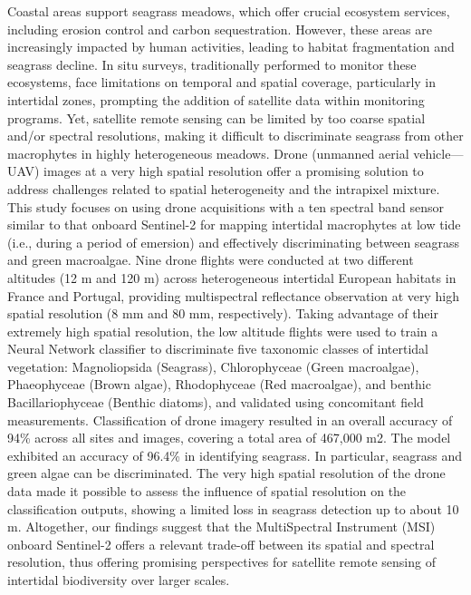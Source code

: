 \documentclass[
  letterpaper,
  11pt,
  english,
  singlespacing,
  headsepline]{MastersDoctoralThesis}
\begin{document}

Coastal areas support seagrass meadows, which offer crucial ecosystem
services, including erosion control and carbon sequestration. However,
these areas are increasingly impacted by human activities, leading to
habitat fragmentation and seagrass decline. In situ surveys,
traditionally performed to monitor these ecosystems, face limitations on
temporal and spatial coverage, particularly in intertidal zones,
prompting the addition of satellite data within monitoring programs.
Yet, satellite remote sensing can be limited by too coarse spatial
and/or spectral resolutions, making it difficult to discriminate
seagrass from other macrophytes in highly heterogeneous meadows. Drone
(unmanned aerial vehicle---UAV) images at a very high spatial resolution
offer a promising solution to address challenges related to spatial
heterogeneity and the intrapixel mixture. This study focuses on using
drone acquisitions with a ten spectral band sensor similar to that
onboard Sentinel-2 for mapping intertidal macrophytes at low tide (i.e.,
during a period of emersion) and effectively discriminating between
seagrass and green macroalgae. Nine drone flights were conducted at two
different altitudes (12 m and 120 m) across heterogeneous intertidal
European habitats in France and Portugal, providing multispectral
reflectance observation at very high spatial resolution (8 mm and 80 mm,
respectively). Taking advantage of their extremely high spatial
resolution, the low altitude flights were used to train a Neural Network
classifier to discriminate five taxonomic classes of intertidal
vegetation: Magnoliopsida (Seagrass), Chlorophyceae (Green macroalgae),
Phaeophyceae (Brown algae), Rhodophyceae (Red macroalgae), and benthic
Bacillariophyceae (Benthic diatoms), and validated using concomitant
field measurements. Classification of drone imagery resulted in an
overall accuracy of 94\% across all sites and images, covering a total
area of 467,000 m2. The model exhibited an accuracy of 96.4\% in
identifying seagrass. In particular, seagrass and green algae can be
discriminated. The very high spatial resolution of the drone data made
it possible to assess the influence of spatial resolution on the
classification outputs, showing a limited loss in seagrass detection up
to about 10 m. Altogether, our findings suggest that the MultiSpectral
Instrument (MSI) onboard Sentinel-2 offers a relevant trade-off between
its spatial and spectral resolution, thus offering promising
perspectives for satellite remote sensing of intertidal biodiversity
over larger scales.
\end{document}
